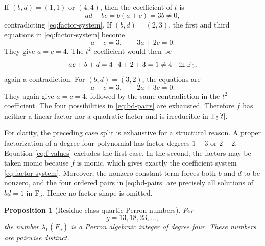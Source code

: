 \documentclass[11pt]{article}
\newtheorem{proposition}[theorem]{Proposition}
\theoremstyle{remark}
\numberwithin{equation}{section}
\begin{document}
If \((b,d)=(1,1)\) or \((4,4)\), then the coefficient of \(t\) is
\[
ad+bc=b(a+c)=3b\neq0,
\]
contradicting \eqref{eq:factor-system}.  If
\((b,d)=(2,3)\), the first and third equations in
\eqref{eq:factor-system} become
\[
a+c=3,\qquad3a+2c=0.
\]
They give \(a=c=4\).  The \(t^2\)-coefficient would then be
\[
ac+b+d=4\cdot4+2+3=1\neq4
\quad\text{in }\mathbb{F}_{5},
\]
again a contradiction.  For \((b,d)=(3,2)\), the equations are
\[
a+c=3,\qquad2a+3c=0.
\]
They again give \(a=c=4\), followed by the same contradiction in the
\(t^2\)-coefficient.  The four possibilities in \eqref{eq:bd-pairs} are
exhausted.  Therefore \(f\) has neither a linear factor nor a quadratic
factor and is irreducible in \(\mathbb{F}_{5}[t]\).

For clarity, the preceding case split is exhaustive for a structural
reason.  A proper factorization of a degree-four polynomial has factor
degrees \(1+3\) or \(2+2\).  Equation \eqref{eq:f-values} excludes the first
case.  In the second, the factors may be taken monic because \(f\) is monic,
which gives exactly the coefficient system \eqref{eq:factor-system}.
Moreover, the nonzero constant term forces both \(b\) and \(d\) to be
nonzero, and the four ordered pairs in \eqref{eq:bd-pairs} are precisely all
solutions of \(bd=1\) in \(\mathbb{F}_{5}\).  Hence no factor shape is omitted.

\begin{proposition}[Residue-class quartic Perron numbers]\label{prop:perron}
For
\[
g=13,18,23,\ldots,
\]
the number \(\lambda_1(F_g)\) is a Perron algebraic integer of degree four.
These numbers are pairwise distinct.
\end{proposition}
\end{document}
